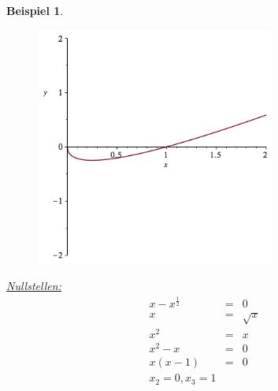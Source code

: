 \documentclass[a4paper,10pt]{report}
\newtheorem{myexample}{Beispiel}
\begin{document}
\begin{myexample}
\begin{enumerate}
\begin{figure}[ht]
			\centering
			\includegraphics[width=0.7\textwidth]{images/x-sqrt(x).png}
		\end{figure}
		\underline{Nullstellen:}
		\begin{eqnarray*}
			x -x^{\frac{1}{2}} &=& 0\\
			x &=& \sqrt{x}\\
			x^2 &=& x\\
			x^2-x &=& 0\\
			x(x-1) &=& 0\\
			x_2 = 0, x_3 = 1
		\end{eqnarray*}
	\end{enumerate}
\end{myexample}
\newpage
\end{document}
